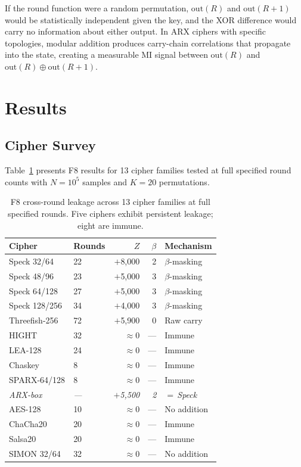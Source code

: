 \documentclass[conference,a4paper]{IEEEtran}
\begin{document}
If the round function were a random permutation, $\mathrm{out}(R)$ and $\mathrm{out}(R{+}1)$ would be statistically independent given the key, and the XOR difference would carry no information about either output. In ARX ciphers with specific topologies, modular addition produces carry-chain correlations that propagate into the state, creating a measurable MI signal between $\mathrm{out}(R)$ and $\mathrm{out}(R) \oplus \mathrm{out}(R{+}1)$.

\section{Results}

\subsection{Cipher Survey}

Table~\ref{tab:survey} presents F8 results for 13 cipher families tested at full specified round counts with $N = 10^5$ samples and $K = 20$ permutations.

\begin{table}[t]
\centering
\caption{F8 cross-round leakage across 13 cipher families at full specified rounds. Five ciphers exhibit persistent leakage; eight are immune.}
\label{tab:survey}
\small
\begin{tabular}{@{}llrrl@{}}
\toprule
\textbf{Cipher} & \textbf{Rounds} & \textbf{$Z$} & \textbf{$\beta$} & \textbf{Mechanism} \\
\midrule
Speck 32/64    & 22 & $+$8,000  & 2 & $\beta$-masking \\
Speck 48/96    & 23 & $+$5,000  & 3 & $\beta$-masking \\
Speck 64/128   & 27 & $+$5,000  & 3 & $\beta$-masking \\
Speck 128/256  & 34 & $+$4,000  & 3 & $\beta$-masking \\
Threefish-256  & 72 & $+$5,900  & 0 & Raw carry \\
\midrule
HIGHT          & 32 & $\approx 0$ & --- & Immune \\
LEA-128        & 24 & $\approx 0$ & --- & Immune \\
Chaskey        &  8 & $\approx 0$ & --- & Immune \\
SPARX-64/128   &  8 & $\approx 0$ & --- & Immune \\
\rowcolor{orange!12} \quad\textit{ARX-box} & \textit{---} & \textit{$+$5,500} & \textit{2} & \textit{$=$\,Speck} \\
AES-128        & 10 & $\approx 0$ & --- & No addition \\
ChaCha20       & 20 & $\approx 0$ & --- & Immune \\
Salsa20        & 20 & $\approx 0$ & --- & Immune \\
SIMON 32/64    & 32 & $\approx 0$ & --- & No addition \\
\bottomrule
\end{tabular}
\end{table}
\end{document}

